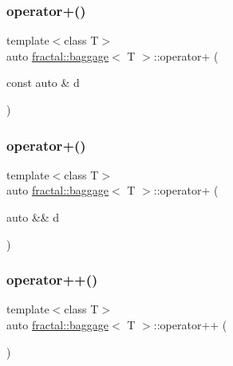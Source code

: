 \mbox{\label{classfractal_1_1baggage_a7a577be2bbc5619052bb8756c20ddb34}} 
\subsubsection{\texorpdfstring{operator+()}{operator+()}\hspace{0.1cm}{\footnotesize\ttfamily [2/3]}}
{\footnotesize\ttfamily template$<$class T$>$ \\
auto \hyperlink{classfractal_1_1baggage}{fractal\+::baggage}$<$ T $>$\+::operator+ (\begin{DoxyParamCaption}\item[{const auto \&}]{d }\end{DoxyParamCaption})\hspace{0.3cm}{\ttfamily [inline]}}

\mbox{\label{classfractal_1_1baggage_a6ad398719ada281520d99e1be3d040fa}} 
\subsubsection{\texorpdfstring{operator+()}{operator+()}\hspace{0.1cm}{\footnotesize\ttfamily [3/3]}}
{\footnotesize\ttfamily template$<$class T$>$ \\
auto \hyperlink{classfractal_1_1baggage}{fractal\+::baggage}$<$ T $>$\+::operator+ (\begin{DoxyParamCaption}\item[{auto \&\&}]{d }\end{DoxyParamCaption})\hspace{0.3cm}{\ttfamily [inline]}}

\mbox{\label{classfractal_1_1baggage_a7ab638cfc6c7c77d20f84aa99e780da8}} 
\subsubsection{\texorpdfstring{operator++()}{operator++()}}
{\footnotesize\ttfamily template$<$class T$>$ \\
auto \hyperlink{classfractal_1_1baggage}{fractal\+::baggage}$<$ T $>$\+::operator++ (\begin{DoxyParamCaption}{ }\end{DoxyParamCaption})\hspace{0.3cm}{\ttfamily [inline]}}

